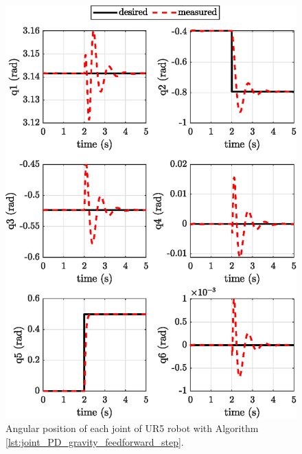 \begin{figure}[H]
	\centering
	\includegraphics{images/act_1.7_step/joint_position.eps}
	\caption{Angular position of each joint of UR5 robot with Algorithm \ref{lst:joint_PD_gravity_feedforward_step}.}
	\label{fig:act_1.7_step_joint_position}
\end{figure}
